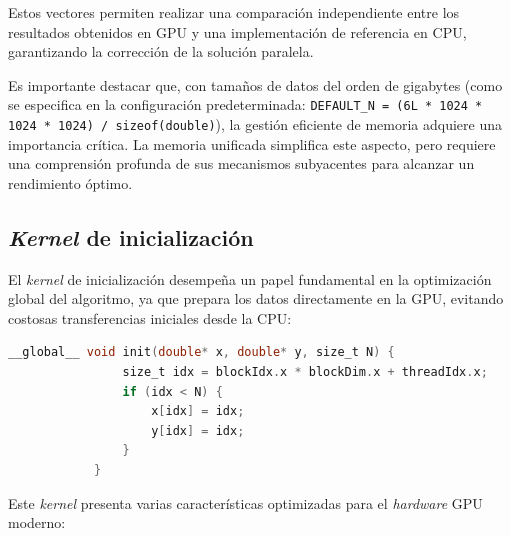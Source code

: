         Estos vectores permiten realizar una comparación independiente entre los resultados obtenidos en GPU y una implementación de referencia en CPU, garantizando la corrección de la solución paralela.
        
        Es importante destacar que, con tamaños de datos del orden de gigabytes (como se especifica en la configuración predeterminada: \texttt{DEFAULT\_N = (6L * 1024 * 1024 * 1024) / sizeof(double)}), la gestión eficiente de memoria adquiere una importancia crítica. La memoria unificada simplifica este aspecto, pero requiere una comprensión profunda de sus mecanismos subyacentes para alcanzar un rendimiento óptimo.
        
    \subsection{\textit{Kernel} de inicialización}

        El \textit{kernel} de inicialización desempeña un papel fundamental en la optimización global del algoritmo, ya que prepara los datos directamente en la GPU, evitando costosas transferencias iniciales desde la CPU:
        
        \begin{lstlisting}[language=C, caption={Código kernel daxpy.}, gobble=12]
            __global__ void init(double* x, double* y, size_t N) {
                size_t idx = blockIdx.x * blockDim.x + threadIdx.x;
                if (idx < N) {
                    x[idx] = idx;
                    y[idx] = idx;
                }
            }
        \end{lstlisting}

        Este \textit{kernel} presenta varias características optimizadas para el \textit{hardware} GPU moderno:

